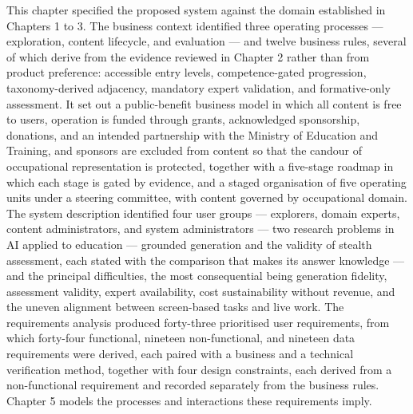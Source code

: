 This chapter specified the proposed system against the domain established in Chapters 1 to 3. The business context identified three operating processes --- exploration, content lifecycle, and evaluation --- and twelve business rules, several of which derive from the evidence reviewed in Chapter 2 rather than from product preference: accessible entry levels, competence-gated progression, taxonomy-derived adjacency, mandatory expert validation, and formative-only assessment. It set out a public-benefit business model in which all content is free to users, operation is funded through grants, acknowledged sponsorship, donations, and an intended partnership with the Ministry of Education and Training, and sponsors are excluded from content so that the candour of occupational representation is protected, together with a five-stage roadmap in which each stage is gated by evidence, and a staged organisation of five operating units under a steering committee, with content governed by occupational domain. The system description identified four user groups --- explorers, domain experts, content administrators, and system administrators --- two research problems in AI applied to education --- grounded generation and the validity of stealth assessment, each stated with the comparison that makes its answer knowledge --- and the principal difficulties, the most consequential being generation fidelity, assessment validity, expert availability, cost sustainability without revenue, and the uneven alignment between screen-based tasks and live work. The requirements analysis produced forty-three prioritised user requirements, from which forty-four functional, nineteen non-functional, and nineteen data requirements were derived, each paired with a business and a technical verification method, together with four design constraints, each derived from a non-functional requirement and recorded separately from the business rules. Chapter 5 models the processes and interactions these requirements imply.
